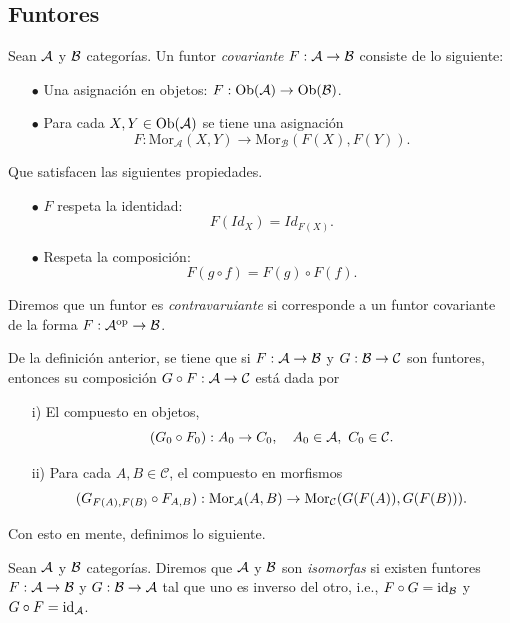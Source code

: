 \subsection{Funtores}
\begin{definition}
Sean ${\mathcal A}$ y ${\mathcal B}$ categorías. Un funtor \emph{covariante} $F:{\mathcal A}\rightarrow{\mathcal B}$ consiste de lo siguiente:
\begin{enumerate}
\item[$\bullet$] Una asignación en objetos: $F:\operatorname{Ob}({\mathcal A})\rightarrow \operatorname{Ob}({\mathcal B})$.
\item[$\bullet$] Para cada $X,Y\in\operatorname{Ob}({\mathcal A})$ se tiene una asignación
\[F: \mathrm{Mor}_\mathcal{A}(X,Y)\rightarrow \mathrm{Mor}_\mathcal{B}(F(X),F(Y)).\]	
\end{enumerate}
Que satisfacen las siguientes propiedades.
\begin{enumerate}
		\item[$\bullet$] $F$ respeta la identidad:	
		\[ F(Id_X)=Id_{F(X)}. \]
		\item[$\bullet$] Respeta la composición:
		\[ F(g\circ f) = F(g)\circ F(f).\]
\end{enumerate}
\end{definition}
\begin{definition} Diremos que un funtor es \emph{contravaruiante} si corresponde a un funtor covariante de la forma $F:{\mathcal A}^{\mathrm{op}}\rightarrow{\mathcal B}$.
\end{definition}
De la definición anterior, se tiene que si $F:{\mathcal A}\to{\mathcal B}$ y $G:{\mathcal B}\to{\mathcal C}$ son funtores, entonces su composición $G\circ F:{\mathcal A}\to{\mathcal C}$ está dada por
 \begin{enumerate}
     \item[i)] El compuesto en objetos, 
     \[(G_0\circ F_0):A_0\to C_0,\quad A_0\in{\mathcal A},\text{ } C_0\in{\mathcal C}.\]
     \item[ii)] Para cada $A,B\in\mathcal{C}$, el compuesto en morfismos
     \[(G_{F(A),F(B)}\circ F_{A,B}):{\mathrm{Mor}}_{\mathcal A}(A,B)\to{\mathrm{Mor}}_{\mathcal C}(G(F(A)),G(F(B))).\]
 \end{enumerate}
 Con esto en mente, definimos lo siguiente.
\begin{definition}
Sean ${\mathcal A}$ y ${\mathcal B}$ categorías. Diremos que ${\mathcal A}$ y ${\mathcal B}$ son \emph{isomorfas} si existen funtores $F:{\mathcal A}\rightarrow {\mathcal B}$ y $G:{\mathcal B}\rightarrow {\mathcal A}$ tal que uno es inverso del otro, i.e., $F\circ G= {\mathrm{id}}_{\mathcal B}$ y $G\circ F={\mathrm{id}}_{\mathcal A}$.
\end{definition}
	
